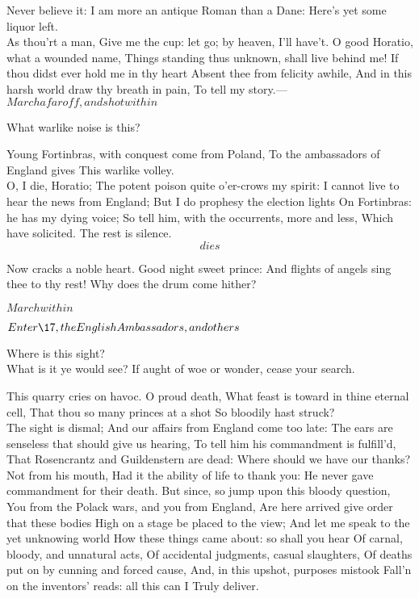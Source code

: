 \documentclass[11pt]{book}
\begin{document}
\6	Never believe it:
	I am more an antique Roman than a Dane:
	Here's yet some liquor left. \\

\1	As thou'rt a man,
	Give me the cup: let go; by heaven, I'll have't.
	O good Horatio, what a wounded name,
	Things standing thus unknown, shall live behind me!
	If thou didst ever hold me in thy heart
	Absent thee from felicity awhile,
	And in this harsh world draw thy breath in pain,
	To tell my story.---\\

	\(March afar off, and shot within\)

	What warlike noise is this?

	Young Fortinbras, with conquest come from Poland,
	To the ambassadors of England gives
	This warlike volley. \\

\1	O, I die, Horatio;
	The potent poison quite o'er-crows my spirit:
	I cannot live to hear the news from England;
	But I do prophesy the election lights
	On Fortinbras: he has my dying voice;
	So tell him, with the occurrents, more and less,
	Which have solicited. The rest is silence. \[dies\]

\6	Now cracks a noble heart. Good night sweet prince:
	And flights of angels sing thee to thy rest!
	Why does the drum come hither?

	\(March within\)

	\(Enter \17, the English Ambassadors,
	and others\)

	Where is this sight? \\

\6	What is it ye would see?
	If aught of woe or wonder, cease your search.

	This quarry cries on havoc. O proud death,
	What feast is toward in thine eternal cell,
	That thou so many princes at a shot
	So bloodily hast struck? \\

	The sight is dismal;
	And our affairs from England come too late:
	The ears are senseless that should give us hearing,
	To tell him his commandment is fulfill'd,
	That Rosencrantz and Guildenstern are dead:
	Where should we have our thanks? \\

\6	Not from his mouth,
	Had it the ability of life to thank you:
	He never gave commandment for their death.
	But since, so jump upon this bloody question,
	You from the Polack wars, and you from England,
	Are here arrived give order that these bodies
	High on a stage be placed to the view;
	And let me speak to the yet unknowing world
	How these things came about: so shall you hear
	Of carnal, bloody, and unnatural acts,
	Of accidental judgments, casual slaughters,
	Of deaths put on by cunning and forced cause,
	And, in this upshot, purposes mistook
	Fall'n on the inventors' reads: all this can I
	Truly deliver. \\
\end{document}
